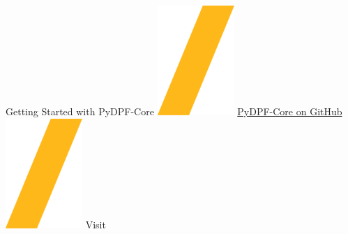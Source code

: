 \documentclass[9pt,landscape]{article}
\begin{document}
\vspace{-0.15cm}
\noindent\makebox[\linewidth]{\rule{\paperwidth}{4pt}}
\begin{center}
Getting Started with PyDPF-Core \includegraphics[height=\fontcharht\font`\S]{slash.png} \href{https://github.com/ansys/pydpf-core}{{\color{blue}PyDPF-Core on GitHub}} \includegraphics[height=\fontcharht\font`\S]{slash.png} Visit 
\end{center}
\end{document}
